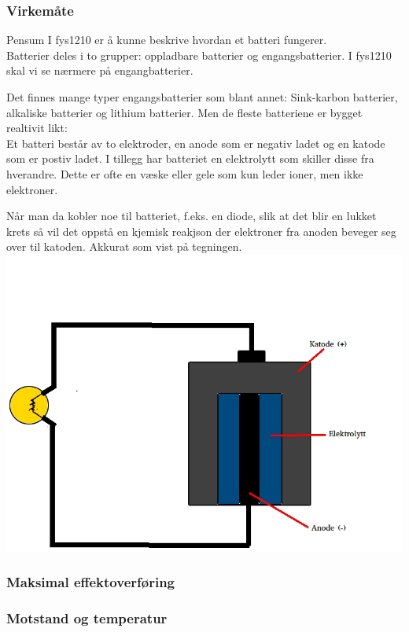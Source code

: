 \subsubsection{Virkemåte}
Pensum I fys1210 er å kunne beskrive hvordan et batteri fungerer.
\\

Batterier deles i to grupper: oppladbare batterier og engangsbatterier.
I fys1210 skal vi se nærmere på engangbatterier.

Det finnes mange typer engangsbatterier som blant annet:
Sink-karbon batterier, alkaliske batterier og lithium batterier.
Men de fleste batteriene er bygget realtivit likt:
\\

Et batteri består av to elektroder,
en anode som er negativ ladet og en katode som er postiv ladet.
I tillegg har batteriet en elektrolytt som skiller disse fra hverandre.
Dette er ofte en væske eller gele som kun leder ioner, men ikke elektroner.

Når man da kobler noe til batteriet, f.eks. en diode,
slik at det blir en lukket krets
så vil det oppstå en kjemisk reakjson
der elektroner fra anoden beveger seg over til katoden.
Akkurat som vist på tegningen.
\\
\includegraphics[width=\textwidth]{./img/batteri}

\subsubsection{Maksimal effektoverføring}


\subsubsection{Motstand og temperatur}

